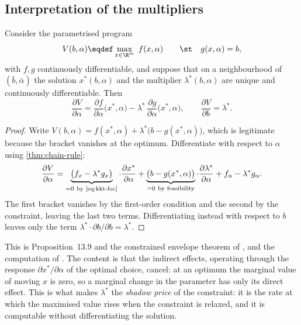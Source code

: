 \subsection{Interpretation of the multipliers}

\begin{theorem}\label{thm:envelope}
	Consider the parametrised program
	\[
		V(b,\alpha)\eqdef\max_{x\in\R^m}\ f(x,\alpha)
		\qquad\st\quad g(x,\alpha)=b,
	\]
	with $f,g$ continuously differentiable, and suppose that on a neighbourhood of
	$(\bar b,\bar\alpha)$ the solution $x^\ast(b,\alpha)$ and the multiplier
	$\lambda^\ast(b,\alpha)$ are unique and continuously differentiable. Then
	\begin{equation}\label{eq:envelope}
		\frac{\partial V}{\partial\alpha}
		=\frac{\partial f}{\partial\alpha}\bigl(x^\ast,\alpha\bigr)
		-\lambda^\ast\,\frac{\partial g}{\partial\alpha}\bigl(x^\ast,\alpha\bigr),
		\qquad
		\frac{\partial V}{\partial b}=\lambda^\ast .
	\end{equation}
\end{theorem}

\begin{proof}
	Write $V(b,\alpha)=f(x^\ast,\alpha)+\lambda^\ast\bigl(b-g(x^\ast,\alpha)\bigr)$,
	which is legitimate because the bracket vanishes at the optimum. Differentiate
	with respect to $\alpha$ using \autoref{thm:chain-rule}:
	\[
		\frac{\partial V}{\partial\alpha}
		=\underbrace{\bigl(f_x-\lambda^\ast g_x\bigr)}_{=0\ \text{by \eqref{eq:kkt-foc}}}
		\cdot\frac{\partial x^\ast}{\partial\alpha}
		+\underbrace{\bigl(b-g(x^\ast,\alpha)\bigr)}_{=0\ \text{by feasibility}}
		\cdot\frac{\partial\lambda^\ast}{\partial\alpha}
		+f_\alpha-\lambda^\ast g_\alpha .
	\]
	The first bracket vanishes by the first-order condition and the second by the
	constraint, leaving the last two terms. Differentiating instead with respect to
	$b$ leaves only the term $\lambda^\ast\cdot\partial b/\partial b=\lambda^\ast$.
\end{proof}

This is Proposition~13.9 and the constrained envelope theorem of
\textcite[pp.~479--481]{fukuda2026notes}, and the computation of
\autocite[slide 28]{fukuda2026optimization}. The content is that the indirect
effects, operating through the response $\partial x^\ast/\partial\alpha$ of the
optimal choice, cancel: at an optimum the marginal value of moving $x$ is zero,
so a marginal change in the parameter has only its direct effect. This is what
makes $\lambda^\ast$ the \emph{shadow price} of the constraint: it is the rate at
which the maximised value rises when the constraint is relaxed, and it is
computable without differentiating the solution.

